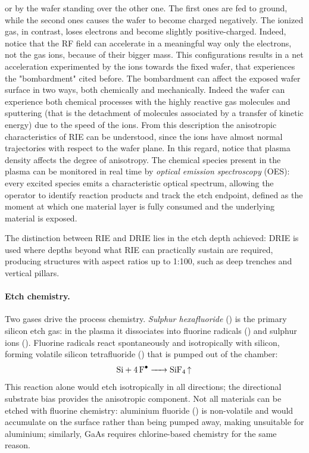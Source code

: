 \begin{itemize}
    or by the wafer standing over the other one. The first ones are fed to
    ground, while the second ones causes the wafer to become charged negatively.
    The ionized gas, in contrast, loses electrons and become slightly
    positive-charged. Indeed, notice that the RF field can accelerate
    in a meaningful
    way only the electrons, not the gas ions, because of their
    bigger mass. This configurations results in a net acceleration experimented
    by the ions towards the fixed wafer, that experiences the "bombardment"
    cited before. The bombardment can affect the exposed wafer
    surface in two ways,
    both chemically and mechanically. Indeed the wafer can experience both
    chemical processes with the highly reactive gas molecules and sputtering
    (that is the detachment of molecules associated by a transfer of
    kinetic energy)
    due to the speed of the ions.
    From this description the anisotropic characteristics of RIE
    can be understood, since the ions have almost normal trajectories
    with respect
    to the wafer plane. In this regard, notice that plasma density affects the
    degree of anisotropy. The chemical species present in the plasma can be
    monitored in real time by \textit{optical emission spectroscopy} (OES): every
    excited species emits a characteristic optical spectrum, allowing the operator
    to identify reaction products and track the etch endpoint, defined as the moment
    at which one material layer is fully consumed and the underlying material is exposed.

    The distinction between RIE and DRIE lies in the etch depth achieved: DRIE
    is used where depths beyond what RIE can practically sustain are required,
    producing structures with aspect ratios up to 1:100, such as deep trenches
    and vertical pillars.

    \paragraph*{Etch chemistry.}
    Two gases drive the process chemistry. \textit{Sulphur hexafluoride}
    () is the primary silicon etch gas: in the plasma it dissociates
    into fluorine radicals () and sulphur ions ().
    Fluorine radicals react spontaneously and isotropically with silicon,
    forming volatile silicon tetrafluoride () that is pumped out of the
    chamber:
    \begin{equation*}
      \ce{Si + 4F^{.} -> SiF4 ^}
    \end{equation*}
    This reaction alone would etch isotropically in all directions; the
    directional substrate bias provides the anisotropic component. Not all
    materials can be etched with fluorine chemistry: aluminium fluoride
    () is non-volatile and would accumulate on the surface rather than
    being pumped away, making  unsuitable for aluminium; similarly,
    GaAs requires chlorine-based chemistry for the same reason.


\end{itemize}
